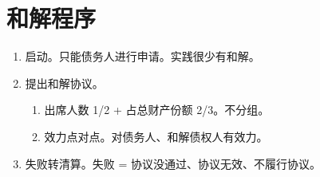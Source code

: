\section{和解程序}
\begin{enumerate}
  \item 启动。只能债务人进行申请。实践很少有和解。
  \item 提出和解协议。
        \begin{enumerate}
          \item 出席人数 1/2 + 占总财产份额 2/3。不分组。
          \item 效力点对点。对债务人、和解债权人有效力。
        \end{enumerate}
  \item 失败转清算。失败 = 协议没通过、协议无效、不履行协议。
\end{enumerate}
